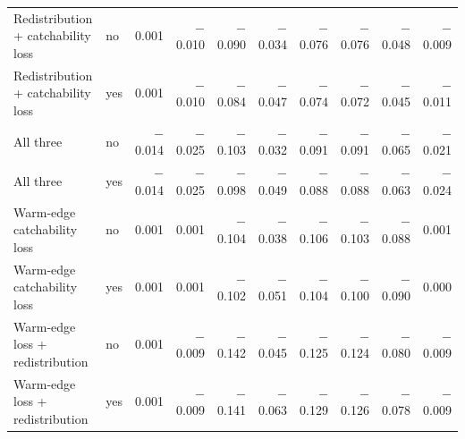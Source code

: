 \documentclass[11pt,a4paper]{article}
\begin{document}
\begin{table}[htbp]
\begin{tabular}{@{}>{\raggedright\arraybackslash}p{2.9cm}lrrrrrrrr@{}}
Redistribution + catchability loss & no & 0.001 & $-$0.010 & $-$0.090 & $-$0.034 & $-$0.076 & $-$0.076 & $-$0.048 & $-$0.009 \\
Redistribution + catchability loss & yes & 0.001 & $-$0.010 & $-$0.084 & $-$0.047 & $-$0.074 & $-$0.072 & $-$0.045 & $-$0.011 \\
All three & no & $-$0.014 & $-$0.025 & $-$0.103 & $-$0.032 & $-$0.091 & $-$0.091 & $-$0.065 & $-$0.021 \\
All three & yes & $-$0.014 & $-$0.025 & $-$0.098 & $-$0.049 & $-$0.088 & $-$0.088 & $-$0.063 & $-$0.024 \\
Warm-edge catchability loss & no & 0.001 & 0.001 & $-$0.104 & $-$0.038 & $-$0.106 & $-$0.103 & $-$0.088 & 0.001 \\
Warm-edge catchability loss & yes & 0.001 & 0.001 & $-$0.102 & $-$0.051 & $-$0.104 & $-$0.100 & $-$0.090 & 0.000 \\
Warm-edge loss + redistribution & no & 0.001 & $-$0.009 & $-$0.142 & $-$0.045 & $-$0.125 & $-$0.124 & $-$0.080 & $-$0.009 \\
Warm-edge loss + redistribution & yes & 0.001 & $-$0.009 & $-$0.141 & $-$0.063 & $-$0.129 & $-$0.126 & $-$0.078 & $-$0.009 \\
\bottomrule
\end{tabular}
\end{table}
\end{document}
